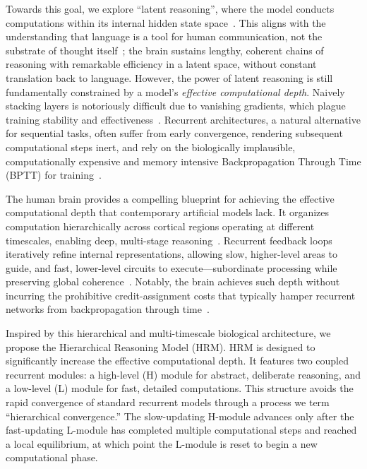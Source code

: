 Towards this goal, we explore ``latent reasoning'', where the model conducts computations within its internal hidden state space~\cite{Chen2025ReasoningBL, CoconutLatentReasoning2024}. This aligns with the understanding that language is a tool for human communication, not the substrate of thought itself~\cite{fedorenko2024language}; the brain sustains lengthy, coherent chains of reasoning with remarkable efficiency in a latent space, without constant translation back to language. However, the power of latent reasoning is still fundamentally constrained by a model's \textit{effective computational depth}. Naively stacking layers is notoriously difficult due to vanishing gradients, which plague training stability and effectiveness~\citep{Goodfellow-et-al-2016, wang2024deepnet}. Recurrent architectures, a natural alternative for sequential tasks, often suffer from early convergence, rendering subsequent computational steps inert, and rely on the biologically implausible, computationally expensive and memory intensive Backpropagation Through Time (BPTT) for training~\cite{LILLICRAP201982}.

The human brain provides a compelling blueprint for achieving the effective computational depth that contemporary artificial models lack. It organizes computation hierarchically across cortical regions operating at different timescales, enabling deep, multi-stage reasoning~\citep{murray2014hierarchy, zeraati2023intrinsic, huntenburg2018large}. Recurrent feedback loops iteratively refine internal representations, allowing slow, higher-level areas to guide, and fast, lower-level circuits to execute—subordinate processing while preserving global coherence~\citep{lamme2000distinct, bastos2012canonical, kaleb2024feedback}. Notably, the brain achieves such depth without incurring the prohibitive credit-assignment costs that typically hamper recurrent networks from backpropagation through time~\citep{LILLICRAP201982, lillicrap2020backpropagation}.



Inspired by this hierarchical and multi-timescale biological architecture, we propose the Hierarchical Reasoning Model (HRM). HRM is designed to significantly increase the effective computational depth. It features two coupled recurrent modules: a high-level (H) module for abstract, deliberate reasoning, and a low-level (L) module for fast, detailed computations. This structure avoids the rapid convergence of standard recurrent models through a process we term ``hierarchical convergence.'' The slow-updating H-module advances only after the fast-updating L-module has completed multiple computational steps and reached a local equilibrium, at which point the L-module is reset to begin a new computational phase.

